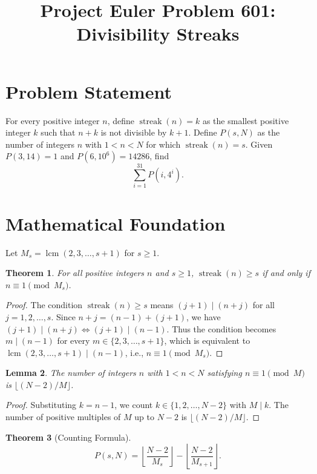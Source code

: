 \documentclass[12pt]{article}
\title{Project Euler Problem 601: Divisibility Streaks}
\author{}
\date{}
\newtheorem{theorem}{Theorem}
\newtheorem{lemma}[theorem]{Lemma}
\begin{document}
\maketitle

\section{Problem Statement}

For every positive integer $n$, define $\operatorname{streak}(n) = k$ as the smallest positive integer $k$ such that $n + k$ is not divisible by $k + 1$. Define $P(s, N)$ as the number of integers $n$ with $1 < n < N$ for which $\operatorname{streak}(n) = s$. Given $P(3, 14) = 1$ and $P(6, 10^6) = 14286$, find
\[
\sum_{i=1}^{31} P(i, 4^i).
\]

\section{Mathematical Foundation}

Let $M_s = \operatorname{lcm}(2, 3, \ldots, s+1)$ for $s \geq 1$.

\begin{theorem}
For all positive integers $n$ and $s \geq 1$, $\operatorname{streak}(n) \geq s$ if and only if $n \equiv 1 \pmod{M_s}$.
\end{theorem}

\begin{proof}
The condition $\operatorname{streak}(n) \geq s$ means $(j+1) \mid (n+j)$ for all $j = 1, 2, \ldots, s$. Since $n + j = (n-1) + (j+1)$, we have $(j+1) \mid (n+j) \iff (j+1) \mid (n-1)$. Thus the condition becomes $m \mid (n-1)$ for every $m \in \{2, 3, \ldots, s+1\}$, which is equivalent to $\operatorname{lcm}(2,3,\ldots,s+1) \mid (n-1)$, i.e., $n \equiv 1 \pmod{M_s}$.
\end{proof}

\begin{lemma}
The number of integers $n$ with $1 < n < N$ satisfying $n \equiv 1 \pmod{M}$ is $\lfloor (N-2)/M \rfloor$.
\end{lemma}

\begin{proof}
Substituting $k = n - 1$, we count $k \in \{1, 2, \ldots, N-2\}$ with $M \mid k$. The number of positive multiples of $M$ up to $N - 2$ is $\lfloor (N-2)/M \rfloor$.
\end{proof}

\begin{theorem}[Counting Formula]
\[
P(s, N) = \left\lfloor \frac{N-2}{M_s} \right\rfloor - \left\lfloor \frac{N-2}{M_{s+1}} \right\rfloor.
\]
\end{theorem}
\end{document}
